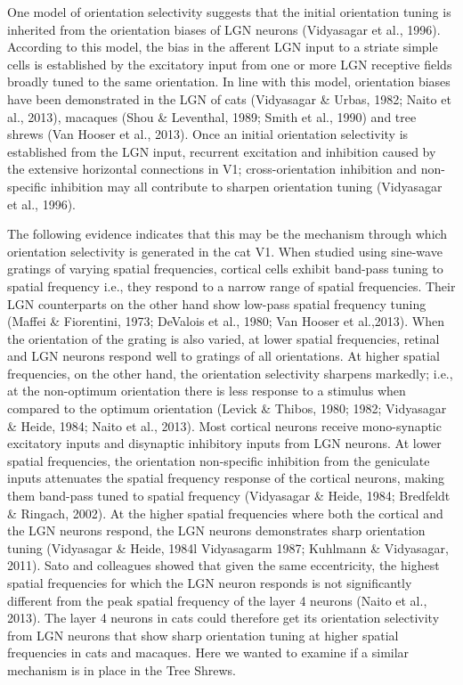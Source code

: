 One model of orientation selectivity suggests that the initial orientation tuning is inherited from the orientation biases of LGN neurons (Vidyasagar et al., 1996). According to this model, the bias in the afferent LGN input to a striate simple cells is established by the excitatory input from one or more LGN receptive fields broadly tuned to the same orientation. In line with this model, orientation biases have been demonstrated in the LGN of cats (Vidyasagar \& Urbas, 1982; Naito et al., 2013), macaques (Shou \& Leventhal, 1989; Smith et al., 1990) and tree shrews (Van Hooser et al., 2013). Once an initial orientation selectivity is established from the LGN input, recurrent excitation and inhibition caused by the extensive horizontal connections in V1; cross-orientation inhibition and non-specific inhibition may all contribute to sharpen orientation tuning (Vidyasagar et al., 1996).

The following evidence indicates that this may be the mechanism through which orientation selectivity is generated in the cat V1. When studied using sine-wave gratings of varying spatial frequencies, cortical cells exhibit band-pass tuning to spatial frequency i.e., they respond to a narrow range of spatial frequencies. Their LGN counterparts on the other hand show low-pass spatial frequency tuning (Maffei \& Fiorentini, 1973; DeValois et al., 1980; Van Hooser et al.,2013).  When the orientation of the grating is also varied, at lower spatial frequencies, retinal and LGN neurons respond well to gratings of all orientations. At higher spatial frequencies, on the other hand, the orientation selectivity sharpens markedly; i.e., at the non-optimum orientation there is less response to a stimulus when compared to the optimum orientation (Levick \& Thibos, 1980; 1982; Vidyasagar \& Heide, 1984; Naito et al., 2013). Most cortical neurons receive mono-synaptic excitatory inputs and disynaptic inhibitory inputs from LGN neurons. At lower spatial frequencies, the orientation non-specific inhibition from the geniculate inputs attenuates the spatial frequency response of the cortical neurons, making them band-pass tuned to spatial frequency (Vidyasagar \& Heide, 1984; Bredfeldt \& Ringach, 2002). At the higher spatial frequencies where both the cortical and the LGN neurons respond, the LGN neurons demonstrates sharp orientation tuning (Vidyasagar \& Heide, 1984l Vidyasagarm 1987; Kuhlmann \& Vidyasagar, 2011). Sato and colleagues showed that given the same eccentricity, the highest spatial frequencies for which the LGN neuron responds is not significantly different from the peak spatial frequency of the layer 4 neurons (Naito et al., 2013). The layer 4 neurons in cats could therefore get its orientation selectivity from LGN neurons that show sharp orientation tuning at higher spatial frequencies in cats and macaques. Here we wanted to examine if a similar mechanism is in place in the Tree Shrews.

